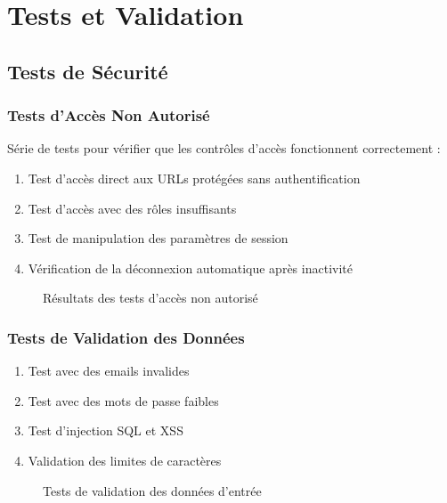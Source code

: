 \documentclass[12pt,a4paper]{article}
\begin{document}
\section{Tests et Validation}

\subsection{Tests de Sécurité}

\subsubsection{Tests d'Accès Non Autorisé}
Série de tests pour vérifier que les contrôles d'accès fonctionnent correctement :

\begin{enumerate}
    \item Test d'accès direct aux URLs protégées sans authentification
    \item Test d'accès avec des rôles insuffisants
    \item Test de manipulation des paramètres de session
    \item Vérification de la déconnexion automatique après inactivité
\end{enumerate}

\begin{figure}[H]
    \centering
    \caption{Résultats des tests d'accès non autorisé}
    \label{fig:tests_acces_non_autorise}
\end{figure}

\subsubsection{Tests de Validation des Données}
\begin{enumerate}
    \item Test avec des emails invalides
    \item Test avec des mots de passe faibles
    \item Test d'injection SQL et XSS
    \item Validation des limites de caractères
\end{enumerate}

\begin{figure}[H]
    \centering
    \caption{Tests de validation des données d'entrée}
    \label{fig:tests_validation_donnees}
\end{figure}
\end{document}
